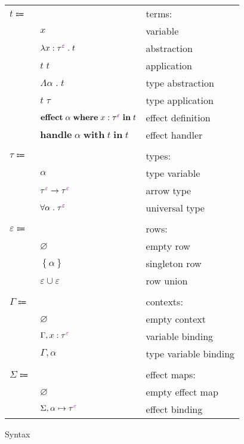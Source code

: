 \documentclass[12pt]{article}
\newcommand\anno[2]{#1 : #2}
\newcommand\term{t}
\newcommand\eVar{x}
\newcommand\eAbsAnno[4]{\lambda \anno{#1}{\tEmbellished{#2}{#3}} \; . \; #4}
\newcommand\eApp[2]{#1 \; #2}
\newcommand\eTAbs[2]{\Lambda #1 \; . \; #2}
\newcommand\eTApp[2]{#1 \; #2}
\newcommand\eHandle[3]{\textbf{handle} \; #1 \; \textbf{with} \; #2 \; \textbf{in} \; #3}
\newcommand\eEffect[5]{\textbf{effect} \; #1 \; \textbf{where} \; \anno{#2}{\tEmbellished{#3}{#4}} \; \textbf{in} \; #5}
\newcommand\type{\tau}
\newcommand\tVar{\alpha}
\newcommand\tArrow[4]{\tEmbellished{#1}{#2} \rightarrow \tEmbellished{#3}{#4}}
\newcommand\tForall[3]{\forall #1 \; . \; \tEmbellished{#2}{#3}}
\newcommand\tEmbellished[2]{{#1}^{\textcolor{violet}{#2}}}
\newcommand\row{\varepsilon}
\newcommand\rEmpty{\varnothing}
\newcommand\rSingleton[1]{\left\{ #1 \right\}}
\newcommand\rUnion[2]{#1 \cup #2}
\newcommand\context{\Gamma}
\newcommand\cEmpty{\varnothing}
\newcommand\cTExtend[4]{#1, \anno{#2}{\tEmbellished{#3}{#4}}}
\newcommand\cKExtend[2]{#1, #2}
\newcommand\effectMap{\Sigma}
\newcommand\emEmpty{\varnothing}
\newcommand\emExtend[4]{#1, #2 \mapsto \tEmbellished{#3}{#4}}
\begin{document}
      \begin{figure}[H]
        \begin{mdframed}[backgroundcolor=none]
          \begin{center}
            \begin{tabular}{l l l}
              $\term \Coloneqq$ & & terms: \\
              & $\eVar$ & variable \\
              & $\eAbsAnno{\eVar}{\type}{\row}{\term}$ & abstraction \\
              & $\eApp{\term}{\term}$ & application \\
              & $\eTAbs{\tVar}{\term}$ & type abstraction \\
              & $\eTApp{\term}{\type}$ & type application \\
              & $\eEffect{\tVar}{\eVar}{\type}{\row}{\term}$ & effect definition \\
              & $\eHandle{\tVar}{\term}{\term}$ & effect handler \\
              \\
              $\type \Coloneqq$ & & types: \\
              & $\tVar$ & type variable \\
              & $\tArrow{\type}{\row}{\type}{\row}$ & arrow type \\
              & $\tForall{\tVar}{\type}{\row}$ & universal type \\
              \\
              $\row \Coloneqq$ & & rows: \\
              & $\rEmpty$ & empty row \\
              & $\rSingleton{\tVar}$ & singleton row \\
              & $\rUnion{\row}{\row}$ & row union \\
              \\
              $\context \Coloneqq$ & & contexts: \\
              & $\cEmpty$ & empty context \\
              & $\cTExtend{\context}{\eVar}{\type}{\row}$ & variable binding \\
              & $\cKExtend{\context}{\tVar}$ & type variable binding \\
              \\
              $\effectMap \Coloneqq$ & & effect maps: \\
              & $\emEmpty$ & empty effect map \\
              & $\emExtend{\effectMap}{\tVar}{\type}{\row}$ & effect binding \\
            \end{tabular}
          \end{center}

          \caption{Syntax}\label{fig:syntax}
        \end{mdframed}
      \end{figure}
\end{document}
